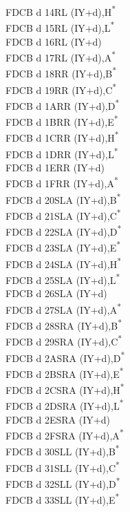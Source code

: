 \documentclass[twoside,openright,a4paper]{book}
\begin{document}
\begin{multicols}{3}
{\begin{tabbing}
	FDCB d 14\>RL (IY+d),H\textsuperscript{*}\\
	FDCB d 15\>RL (IY+d),L\textsuperscript{*}\\
	FDCB d 16\>RL (IY+d)\\
	FDCB d 17\>RL (IY+d),A\textsuperscript{*}\\
	FDCB d 18\>RR (IY+d),B\textsuperscript{*}\\
	FDCB d 19\>RR (IY+d),C\textsuperscript{*}\\
	FDCB d 1A\>RR (IY+d),D\textsuperscript{*}\\
	FDCB d 1B\>RR (IY+d),E\textsuperscript{*}\\
	FDCB d 1C\>RR (IY+d),H\textsuperscript{*}\\
	FDCB d 1D\>RR (IY+d),L\textsuperscript{*}\\
	FDCB d 1E\>RR (IY+d)\\
	FDCB d 1F\>RR (IY+d),A\textsuperscript{*}\\
	FDCB d 20\>SLA (IY+d),B\textsuperscript{*}\\
	FDCB d 21\>SLA (IY+d),C\textsuperscript{*}\\
	FDCB d 22\>SLA (IY+d),D\textsuperscript{*}\\
	FDCB d 23\>SLA (IY+d),E\textsuperscript{*}\\
	FDCB d 24\>SLA (IY+d),H\textsuperscript{*}\\
	FDCB d 25\>SLA (IY+d),L\textsuperscript{*}\\
	FDCB d 26\>SLA (IY+d)\\
	FDCB d 27\>SLA (IY+d),A\textsuperscript{*}\\
	FDCB d 28\>SRA (IY+d),B\textsuperscript{*}\\
	FDCB d 29\>SRA (IY+d),C\textsuperscript{*}\\
	FDCB d 2A\>SRA (IY+d),D\textsuperscript{*}\\
	FDCB d 2B\>SRA (IY+d),E\textsuperscript{*}\\
	FDCB d 2C\>SRA (IY+d),H\textsuperscript{*}\\
	FDCB d 2D\>SRA (IY+d),L\textsuperscript{*}\\
	FDCB d 2E\>SRA (IY+d)\\
	FDCB d 2F\>SRA (IY+d),A\textsuperscript{*}\\
	FDCB d 30\>SLL (IY+d),B\textsuperscript{*}\\
	FDCB d 31\>SLL (IY+d),C\textsuperscript{*}\\
	FDCB d 32\>SLL (IY+d),D\textsuperscript{*}\\
	FDCB d 33\>SLL (IY+d),E\textsuperscript{*}\\

\end{tabbing}}
\end{multicols}
\end{document}
